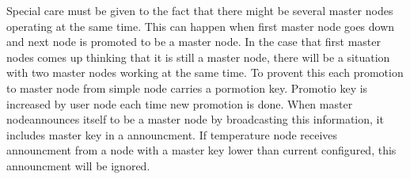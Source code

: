 Special care must be given to the fact that there might be several master nodes operating at the same time. This can happen when first master node goes down and next node is promoted to be a master node. In the case that first master nodes comes up thinking that it is still a master node, there will be a situation with two master nodes working at the same time. To provent this each promotion to master node from simple node carries a pormotion key. Promotio key is increased by user node each time new promotion is done. When master nodeannounces itself to be a master node by broadcasting this information, it includes master key in a announcment. If temperature node receives announcment from a node with a master key lower than current configured, this announcment will be ignored.


